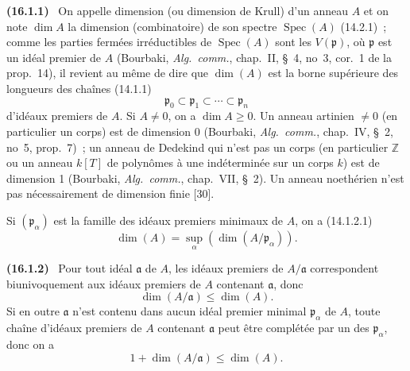 \documentclass[10pt,oneside]{book}
\makeatletter
\newcommand{\setmanualcurrentlabel}[1]{\def\@currentlabel{#1}}
\newenvironment{env}[1][]{\setmanualcurrentlabel{#1}\par\medskip\noindent\textbf{(#1)}\ }{\par}
\makeatother
\begin{document}
\begin{env}[16.1.1]
\label{0.16.1.1-fr}
On appelle dimension (ou dimension de Krull) d'un anneau $A$ et on note
$\dim A$ la dimension (combinatoire) de son spectre
$\operatorname{Spec}(A)$ (14.2.1)~; comme les parties fermées irréductibles de
$\operatorname{Spec}(A)$ sont les
$V(\mathfrak{p})$, où $\mathfrak{p}$ est un idéal premier de $A$ (Bourbaki,
\emph{Alg.~comm.}, chap.~II, \S~4, no~3, cor.~1 de la prop.~14), il revient au
même de dire que $\dim(A)$ est la borne supérieure des longueurs des chaînes
(14.1.1)
\[
  \mathfrak{p}_0\subset\mathfrak{p}_1\subset\cdots\subset\mathfrak{p}_n
\]
d'idéaux premiers de $A$. Si $A\neq0$, on a $\dim A\geq0$. Un anneau artinien
$\neq0$ (en particulier un corps) est de dimension 0 (Bourbaki,
\emph{Alg.~comm.}, chap.~IV, \S~2, no~5, prop.~7)~; un anneau de Dedekind qui
n'est pas un corps (en particulier $\mathbb{Z}$ ou un anneau $k[T]$ de
polynômes à une indéterminée sur un corps $k$) est de dimension 1 (Bourbaki,
\emph{Alg.~comm.}, chap.~VII, \S~2). Un anneau noethérien n'est pas
nécessairement de dimension finie [30].

Si $(\mathfrak{p}_\alpha)$ est la famille des idéaux premiers minimaux de $A$,
on a (14.1.2.1)
\[
\label{0.16.1.1.1-fr}
  \dim(A)=\sup_\alpha(\dim(A/\mathfrak{p}_\alpha)).
\tag{16.1.1.1}
\]
\end{env}

\begin{env}[16.1.2]
\label{0.16.1.2-fr}
Pour tout idéal $\mathfrak{a}$ de $A$, les idéaux premiers de
$A/\mathfrak{a}$ correspondent biunivoquement aux idéaux premiers de $A$
contenant $\mathfrak{a}$, donc
\[
\label{0.16.1.2.1-fr}
  \dim(A/\mathfrak{a})\leq\dim(A).
\tag{16.1.2.1}
\]
Si en outre $\mathfrak{a}$ n'est contenu dans aucun idéal premier minimal
$\mathfrak{p}_\alpha$ de $A$, toute chaîne d'idéaux premiers de $A$ contenant
$\mathfrak{a}$ peut être complétée par un des $\mathfrak{p}_\alpha$, donc on a
\[
\label{0.16.1.2.2-fr}
  1+\dim(A/\mathfrak{a})\leq\dim(A).
\tag{16.1.2.2}
\]
\end{env}
\end{document}
